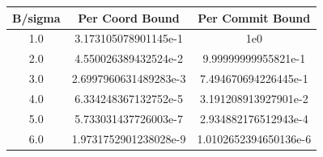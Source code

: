 \begin{tabular}{ccc}
\hline
B/sigma & Per Coord Bound & Per Commit Bound \\
\hline
1.0 & 3.173105078901145e-1 & 1e0 \\
2.0 & 4.550026389432524e-2 & 9.99999999955821e-1 \\
3.0 & 2.6997960631489283e-3 & 7.494670694226445e-1 \\
4.0 & 6.334248367132752e-5 & 3.191208913927901e-2 \\
5.0 & 5.733031437726003e-7 & 2.934882176512943e-4 \\
6.0 & 1.9731752901238028e-9 & 1.0102652394650136e-6 \\
\hline
\end{tabular}

